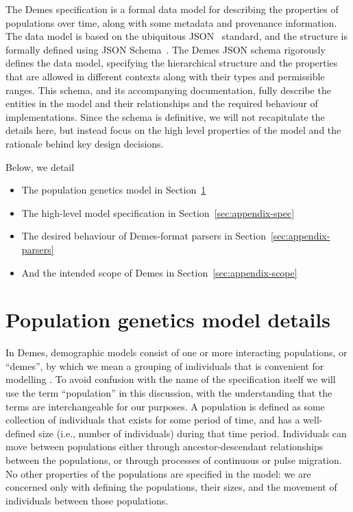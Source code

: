\documentclass[11pt]{article}
\begin{document}
The Demes specification is a formal data model for describing
the properties of populations over time,
along with some metadata and provenance information.
The data model is based on the ubiquitous JSON~\citep{bray2017javascript}
standard, and the structure is formally defined using
JSON Schema~\citep{wright2020json}.
The Demes JSON schema rigorously defines the data model,
specifying the hierarchical structure and the properties that are allowed in different
contexts along with their types and permissible ranges.
This schema, and its accompanying documentation,
fully describe the entities in the model and their
relationships and the required behaviour of implementations.
Since the schema is definitive, we will not recapitulate the details
here, but instead focus on the high level properties of the model and
the rationale behind key design decisions.

Below, we detail
\begin{itemize}
    \item The population genetics model in Section~\ref{sec:appendix-pop-gen-model}
    \item The high-level model specification in Section~\ref{sec:appendix-spec}
    \item The desired behaviour of Demes-format parsers in Section~\ref{sec:appendix-parsers}
    \item And the intended scope of Demes in Section~\ref{sec:appendix-scope}
\end{itemize}

\section{Population genetics model details}\label{sec:appendix-pop-gen-model}

In Demes, demographic models consist of one or more interacting populations,
or ``demes'', by which we mean a grouping of individuals that is convenient
for modelling \citep{gilmour_demes_1939,gilmour_deme_1955}.
To avoid confusion with the name of the specification itself we will
use the term ``population'' in this discussion, with the understanding that the
terms are interchangeable for our purposes.
A population is defined as some collection of individuals that exists for
some period of time, and has a well-defined size (i.e., number of individuals)
during that time period. Individuals can move between populations
either through ancestor-descendant relationships between the populations,
or through processes of continuous or pulse migration.
No other properties of the populations are specified in the model:
we are concerned only with defining the populations, their sizes, and the
movement of individuals between those populations.
\end{document}
